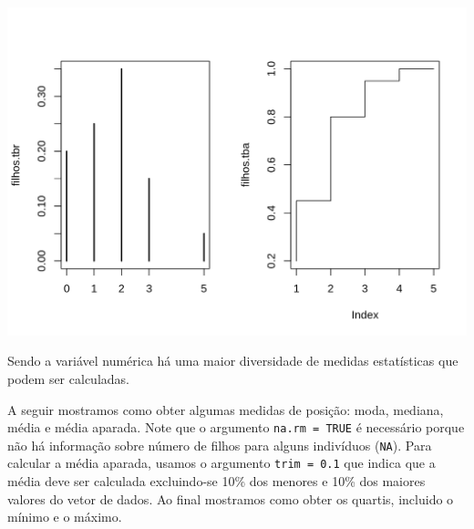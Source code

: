 \documentclass[10pt,a4paper]{book}
\newenvironment{Shaded}{\begin{snugshade}}{\end{snugshade}}
\newcommand{\KeywordTok}[1]{\textcolor[rgb]{0.13,0.29,0.53}{\textbf{#1}}}
\newcommand{\DataTypeTok}[1]{\textcolor[rgb]{0.13,0.29,0.53}{#1}}
\newcommand{\DecValTok}[1]{\textcolor[rgb]{0.00,0.00,0.81}{#1}}
\newcommand{\FloatTok}[1]{\textcolor[rgb]{0.00,0.00,0.81}{#1}}
\newcommand{\StringTok}[1]{\textcolor[rgb]{0.31,0.60,0.02}{#1}}
\newcommand{\OtherTok}[1]{\textcolor[rgb]{0.56,0.35,0.01}{#1}}
\newcommand{\OperatorTok}[1]{\textcolor[rgb]{0.81,0.36,0.00}{\textbf{#1}}}
\newcommand{\NormalTok}[1]{#1}
\begin{document}
\begin{center}\includegraphics{figures/unnamed-chunk-301-1} \end{center}

Sendo a variável numérica há uma maior diversidade de medidas
estatísticas que podem ser calculadas.

A seguir mostramos como obter algumas medidas de posição: moda, mediana,
média e média aparada. Note que o argumento \texttt{na.rm\ =\ TRUE} é
necessário porque não há informação sobre número de filhos para alguns
indivíduos (\texttt{NA}). Para calcular a média aparada, usamos o
argumento \texttt{trim\ =\ 0.1} que indica que a média deve ser
calculada excluindo-se 10\% dos menores e 10\% dos maiores valores do
vetor de dados. Ao final mostramos como obter os quartis, incluido o
mínimo e o máximo.

\begin{Shaded}
\end{Shaded}
\end{document}
